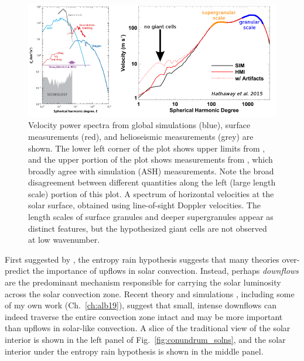 \begin{figure}[t!]
\includegraphics[width=\textwidth]{./figs/intro/conv_conundrum_2.pdf}
\caption[The convective conundrum.]
{
	\citep[a, Fig.~5 from][]{hanasoge&all2016} Velocity power spectra from global simulations (blue), surface measurements (red), and helioseismic measurements (grey) are shown.
	The lower left corner of the plot shows upper limits from \citet{hanasoge&all2012}, and the upper portion of the plot shows measurements from \citet{greer&all2015}, which broadly agree with simulation (ASH) measurements.
	Note the broad disagreement between different quantities along the left (large length scale) portion of this plot.
	\citep[b, annotated Fig.~8 from][]{hathaway&all2015} A spectrum of horizontal velocities at the solar surface, obtained using line-of-sight Doppler velocities.
	The length scales of surface granules and deeper supergranules appear as distinct features, but the hypothesized giant cells are not observed at low wavenumber.
	\label{fig:conv_conundrum} 
}
\end{figure}

First suggested by \cite{spruit1997}, the entropy rain hypothesis suggests that many theories over-predict the importance of upflows in solar convection.
Instead, perhaps \emph{downflows} are the predominant mechanism responsible for carrying the solar luminosity across the solar convection zone.
Recent theory and simulations \citep{brandenburg2016, kapyla&all2017}, including some of my own work (Ch.~\ref{ch:alb19}), suggest that small, intense downflows can indeed traverse the entire convection zone intact and may be more important than upflows in solar-like convection.
A slice of the traditional view of the solar interior is shown in the left panel of Fig.~\ref{fig:conundrum_solns}, and the solar interior under the entropy rain hypothesis is shown in the middle panel.

